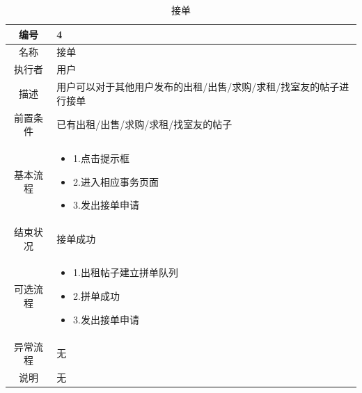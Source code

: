 \begin{table}[htbp]
	\centering
	\begin{tabular}{|c|p{11cm}|}
        \hline
        编号 & 4 \\
        \hline
        名称 & 接单 \\ 
        \hline
        执行者 &用户 \\
        \hline
        描述 & 用户可以对于其他用户发布的出租/出售/求购/求租/找室友的帖子进行接单 \\
        \hline
        前置条件 & 已有出租/出售/求购/求租/找室友的帖子 \\
        \hline
        基本流程 & \begin{itemize}
            \item 1.点击提示框
            \item 2.进入相应事务页面
            \item 3.发出接单申请
        \end{itemize} \\
        \hline
        结束状况 & 接单成功 \\
        \hline
        可选流程 & \begin{itemize}
            \item 1.出租帖子建立拼单队列
            \item 2.拼单成功
            \item 3.发出接单申请
        \end{itemize} \\
        \hline
        异常流程 & 无 \\
        \hline
        说明 & 无 \\
        \hline
    \end{tabular}
    \caption{接单}
\end{table}

